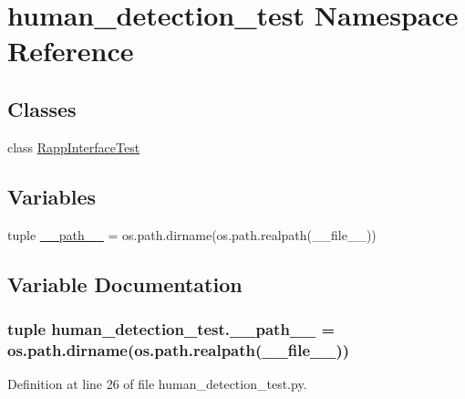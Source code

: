 \hypertarget{namespacehuman__detection__test}{\section{human\-\_\-detection\-\_\-test Namespace Reference}
\label{namespacehuman__detection__test}
}
\subsection*{Classes}
\begin{DoxyCompactItemize}
\item 
class \hyperlink{classhuman__detection__test_1_1RappInterfaceTest}{Rapp\-Interface\-Test}
\end{DoxyCompactItemize}
\subsection*{Variables}
\begin{DoxyCompactItemize}
\item 
tuple \hyperlink{namespacehuman__detection__test_a8f88fb1a45e675009651dba28dbb3886}{\-\_\-\-\_\-path\-\_\-\-\_\-} = os.\-path.\-dirname(os.\-path.\-realpath(\-\_\-\-\_\-file\-\_\-\-\_\-))
\end{DoxyCompactItemize}


\subsection{Variable Documentation}
\hypertarget{namespacehuman__detection__test_a8f88fb1a45e675009651dba28dbb3886}{
\subsubsection[{\-\_\-\-\_\-path\-\_\-\-\_\-}]{\setlength{\rightskip}{0pt plus 5cm}tuple human\-\_\-detection\-\_\-test.\-\_\-\-\_\-path\-\_\-\-\_\- = os.\-path.\-dirname(os.\-path.\-realpath(\-\_\-\-\_\-file\-\_\-\-\_\-))}}\label{namespacehuman__detection__test_a8f88fb1a45e675009651dba28dbb3886}


Definition at line 26 of file human\-\_\-detection\-\_\-test.\-py.

